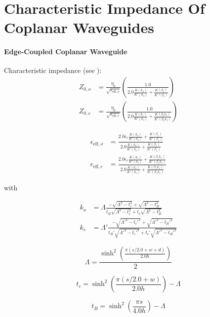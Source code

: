 \section{Characteristic Impedance Of Coplanar Waveguides} \label{app:waveguides}
\paragraph{Edge-Coupled Coplanar Waveguide}

Characteristic impedance (see \cite[~p197-198]{wadell}): 
\begin{align}
	Z_{0,o} &= \frac{\eta_0}{\sqrt{\epsilon_{\text{eff},o}}} \left( \frac{1.0}{2.0 \frac{K(k_o)}{K'(k_o)} + \frac{K(\beta_1)}{K'(\beta_1)}}\right)\\
	Z_{0,e} &= \frac{\eta_0}{\sqrt{\epsilon_{\text{eff},e}}} \left( \frac{1.0}{2.0 \frac{K(k_e)}{K'(k_e)} + \frac{K(\beta_1 k_1)}{K'(\beta_1 k_1)}}\right)
\end{align}    

\begin{align}
	\epsilon_{\text{eff},o} &= \frac{2.0 \epsilon_r \frac{K(k_o)}{K'(k_o)} + \frac{K(\beta_1)}{K'(\beta_1)}}{2.0 \frac{K(k_o)}{K'(k_o)} + \frac{K(\beta_1)}{K'(\beta_1)}}\\
	\epsilon_{\text{eff},e} &= \frac{2.0 \epsilon_r \frac{K(k_e)}{K'(k_e)} + \frac{K(\beta_1 k_1)}{K'(\beta_1 k_1)}}{2.0 \frac{K(k_e)}{K'(k_e)} + \frac{K(\beta_1 k_1)}{K'(\beta_1 k_1)}}
\end{align}

with

\begin{align}
	k_o &= \Lambda \frac{-\sqrt{\Lambda^2 - t_c^2} + \sqrt{\Lambda^2 - t_B^2}}{t_B\sqrt{\Lambda^2 - t_c^2} + t_c \sqrt{\Lambda^2 - t_B^2}}\\
	k_e &= \Lambda' \frac{-\sqrt{\Lambda'^2 - t_c'^2} + \sqrt{\Lambda'^2 - t_B'^2}}{t_B'\sqrt{\Lambda'^2 - t_c'^2} + t_c' \sqrt{\Lambda'^2 - t_B'^2}}
\end{align}


\begin{equation}
	\Lambda = \frac{\sinh^2 \left( \frac{\pi (s/2.0 + w + d)}{2.0 h} \right) }{2}
\end{equation}

\begin{equation}
	t_c = \sinh^2 \left( \frac{\pi (s/2.0 + w)}{2.0 h} \right) - \Lambda
\end{equation}

\begin{equation}
	t_B = \sinh^2 \left( \frac{\pi s}{4.0 h} \right) - \Lambda
\end{equation}



